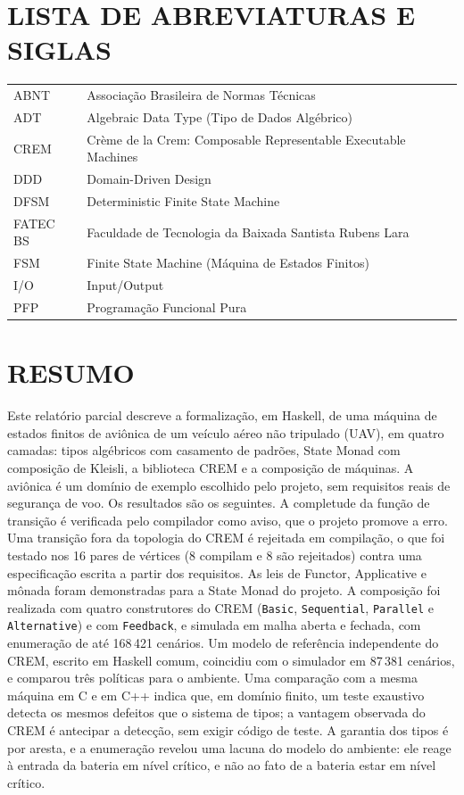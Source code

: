\documentclass[12pt,a4paper]{article}
\begin{document}
\newpage
\section*{LISTA DE ABREVIATURAS E SIGLAS}

\begin{tabular}{ll}
ABNT & Associação Brasileira de Normas Técnicas\\
ADT & Algebraic Data Type (Tipo de Dados Algébrico)\\
CREM & Crème de la Crem: Composable Representable Executable Machines\\
DDD & Domain-Driven Design\\
DFSM & Deterministic Finite State Machine\\
FATEC BS & Faculdade de Tecnologia da Baixada Santista Rubens Lara\\
FSM & Finite State Machine (Máquina de Estados Finitos)\\
I/O & Input/Output\\
PFP & Programação Funcional Pura\\
\end{tabular}

\newpage
\section*{RESUMO}

Este relatório parcial descreve a formalização, em Haskell, de uma máquina de estados finitos de aviônica de um veículo aéreo não tripulado (UAV), em quatro camadas: tipos algébricos com casamento de padrões, State Monad com composição de Kleisli, a biblioteca CREM e a composição de máquinas. A aviônica é um domínio de exemplo escolhido pelo projeto, sem requisitos reais de segurança de voo. Os resultados são os seguintes. A completude da função de transição é verificada pelo compilador como aviso, que o projeto promove a erro. Uma transição fora da topologia do CREM é rejeitada em compilação, o que foi testado nos 16 pares de vértices (8 compilam e 8 são rejeitados) contra uma especificação escrita a partir dos requisitos. As leis de Functor, Applicative e mônada foram demonstradas para a State Monad do projeto. A composição foi realizada com quatro construtores do CREM (\texttt{Basic}, \texttt{Sequential}, \texttt{Parallel} e \texttt{Alternative}) e com \texttt{Feedback}, e simulada em malha aberta e fechada, com enumeração de até 168\,421 cenários. Um modelo de referência independente do CREM, escrito em Haskell comum, coincidiu com o simulador em 87\,381 cenários, e comparou três políticas para o ambiente. Uma comparação com a mesma máquina em C e em C++ indica que, em domínio finito, um teste exaustivo detecta os mesmos defeitos que o sistema de tipos; a vantagem observada do CREM é antecipar a detecção, sem exigir código de teste. A garantia dos tipos é por aresta, e a enumeração revelou uma lacuna do modelo do ambiente: ele reage à entrada da bateria em nível crítico, e não ao fato de a bateria estar em nível crítico.
\end{document}
